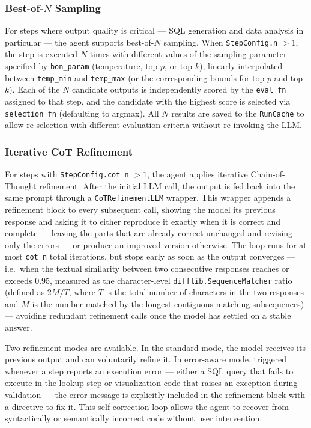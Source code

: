 \subsubsection{Best-of-\texorpdfstring{$N$}{N} Sampling}

For steps where output quality is critical — SQL generation and data analysis in
particular — the agent supports best-of-$N$ sampling. When \texttt{StepConfig.n}
$> 1$, the step is executed $N$ times with different values of the sampling parameter
specified by \texttt{bon\_param} (temperature, top-$p$, or top-$k$), linearly
interpolated between \texttt{temp\_min} and \texttt{temp\_max} (or the corresponding
bounds for top-$p$ and top-$k$). Each of the $N$ candidate outputs is independently
scored by the \texttt{eval\_fn} assigned to that step, and the candidate with the
highest score is selected via \texttt{selection\_fn} (defaulting to argmax). All $N$
results are saved to the \texttt{RunCache} to allow re-selection with different
evaluation criteria without re-invoking the LLM.

\subsubsection{Iterative CoT Refinement}

For steps with \texttt{StepConfig.cot\_n} $> 1$, the agent applies iterative
Chain-of-Thought refinement. After the initial LLM call, the output is fed back into
the same prompt through a \texttt{CoTRefinementLLM} wrapper. This wrapper appends a
refinement block to every subsequent call, showing the model its previous response
and asking it to either reproduce it exactly when it is correct and complete — leaving
the parts that are already correct unchanged and revising only the errors — or produce
an improved version otherwise. The loop runs for at most \texttt{cot\_n} total iterations,
but stops early as soon as the output converges — i.e.\ when the textual similarity
between two consecutive responses reaches or exceeds 0.95, measured as the character-level
\texttt{difflib.SequenceMatcher} ratio (defined as $2M/T$, where $T$ is the total number
of characters in the two responses and $M$ is the number matched by the longest contiguous
matching subsequences) — avoiding redundant refinement calls once the model has settled on
a stable answer.

Two refinement modes are available. In the standard mode, the model receives its
previous output and can voluntarily refine it. In error-aware mode, triggered whenever
a step reports an execution error — either a SQL query that fails to execute in the
lookup step or visualization code that raises an exception during validation — the error
message is explicitly included in the refinement block with a directive to fix it. This
self-correction loop allows the agent to recover from syntactically or semantically
incorrect code without user intervention.

